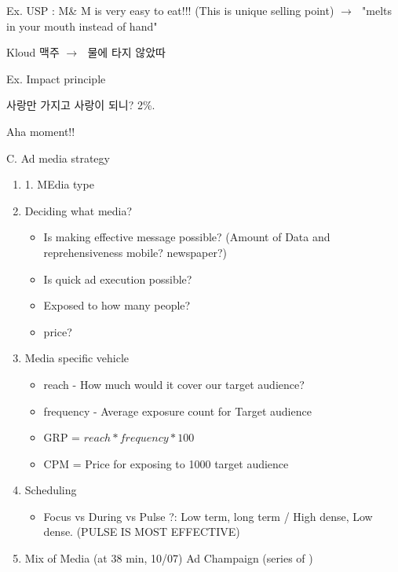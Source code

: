 \documentclass[12pt]{article}
\newcommand{\ra}{$\rightarrow \text{ }$}
\begin{document}
\begin{itemize}
\begin{enumerate}
\begin{enumerate}
	\end{enumerate}
\end{enumerate}

Ex.
USP :
M\& M is very easy to eat!!! (This is unique selling point) \ra "melts in your mouth instead of hand"

Kloud 맥주 \ra 물에 타지 않았따





Ex. Impact principle

사랑만 가지고 사랑이 되니? 2\%.

Aha moment!!






C. Ad media strategy

\begin{enumerate}
	\item 1. MEdia type
	\item Deciding what media?
	\begin{itemize}
		\item Is making effective message possible? (Amount of Data and reprehensiveness mobile? newspaper?)
		\item Is quick ad execution possible?
		\item Exposed to how many people?
		\item price?
	\end{itemize}
	\item Media specific vehicle
	\begin{itemize}
		\item reach - How much would it cover our target audience?
		\item frequency - Average exposure count for Target audience
		\item GRP = $reach * frequency * 100$
		\item CPM = Price for exposing to 1000 target audience
	\end{itemize}
	\item Scheduling
	\begin{itemize}
		\item Focus vs During vs Pulse ?: Low term, long term / High dense, Low dense. (PULSE IS MOST EFFECTIVE)
	\end{itemize}
	\item Mix of Media (at 38 min, 10/07)
	Ad Champaign (series of )
\end{enumerate}






\end{itemize}
\end{document}

